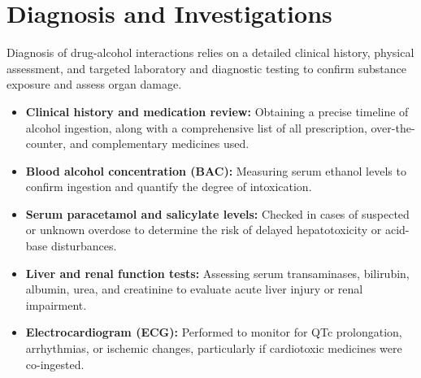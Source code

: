 \section*{Diagnosis and Investigations}
Diagnosis of drug-alcohol interactions relies on a detailed clinical history, physical assessment, and targeted laboratory and diagnostic testing to confirm substance exposure and assess organ damage.
\begin{itemize}
    \item \textbf{Clinical history and medication review:} Obtaining a precise timeline of alcohol ingestion, along with a comprehensive list of all prescription, over-the-counter, and complementary medicines used.
    \item \textbf{Blood alcohol concentration (BAC):} Measuring serum ethanol levels to confirm ingestion and quantify the degree of intoxication.
    \item \textbf{Serum paracetamol and salicylate levels:} Checked in cases of suspected or unknown overdose to determine the risk of delayed hepatotoxicity or acid-base disturbances.
    \item \textbf{Liver and renal function tests:} Assessing serum transaminases, bilirubin, albumin, urea, and creatinine to evaluate acute liver injury or renal impairment.
    \item \textbf{Electrocardiogram (ECG):} Performed to monitor for QTc prolongation, arrhythmias, or ischemic changes, particularly if cardiotoxic medicines were co-ingested.
\end{itemize}

